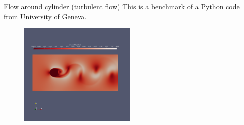 \documentclass{beamer}
\begin{document}
	\begin{frame}{Flow around cylinder (turbulent flow)}
		This is a benchmark of a Python code from University of Geneva. 
		\begin{figure}
			\centering
			\includegraphics[width=0.5\textwidth]{pics/cylinderTurbulent.png}
		\end{figure}
	\end{frame}
\end{document}

